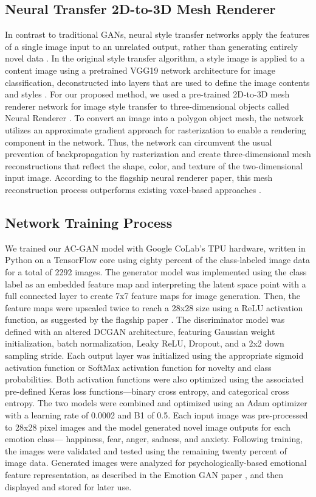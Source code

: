 \documentclass{sigchi}
\begin{document}
\subsection{Neural Transfer 2D-to-3D Mesh Renderer}
In contrast to traditional GANs, neural style transfer networks apply the features of a single image input to an unrelated output, rather than generating entirely novel data \cite{neuraltrans}. In the original style transfer algorithm, a style image is applied to a content image using a pretrained VGG19 network architecture for image classification, deconstructed into layers that are used to define the image contents and styles \cite{neuraltrans}. For our proposed method, we used a pre-trained 2D-to-3D mesh renderer network for image style transfer \cite{DBLP:journals/corr/abs-1711-07566}to three-dimensional objects called Neural Renderer \cite{DBLP:journals/corr/abs-1711-07566}. To convert an image into a polygon object mesh, the network utilizes an approximate gradient approach for rasterization to enable a rendering component in the network. Thus, the network can circumvent the usual prevention of backpropagation by rasterization and create three-dimensional mesh reconstructions that reflect the shape, color, and texture of the two-dimensional input image. According to the flagship neural renderer paper, this mesh reconstruction process outperforms existing voxel-based approaches \cite{DBLP:journals/corr/abs-1711-07566}.

\subsection{Network Training Process}
We trained our AC-GAN model with Google CoLab’s TPU hardware, written in Python on a TensorFlow core using eighty percent of the class-labeled image data for a total of 2292 images. The generator model was implemented using the class label as an embedded feature map and interpreting the latent space point with a full connected layer to create 7x7 feature maps for image generation. Then, the feature maps were upscaled twice to reach a 28x28 size using a ReLU activation function, as suggested by the flagship paper \cite{10.5555/3305890.3305954}. The discriminator model was defined with an altered DCGAN architecture, featuring Gaussian weight initialization, batch normalization, Leaky ReLU, Dropout, and a 2x2 down sampling stride. Each output layer was initialized using the appropriate sigmoid activation function or SoftMax activation function for novelty and class probabilities. Both activation functions were also optimized using the associated pre-defined Keras loss functions—binary cross entropy, and categorical cross entropy. The two models were combined and optimized using an Adam optimizer with a learning rate of 0.0002 and B1 of 0.5. Each input image was pre-processed to 28x28 pixel images and the model generated novel image outputs for each emotion class— happiness, fear, anger, sadness, and anxiety. Following training, the images were validated and tested using the remaining twenty percent of image data. Generated images were analyzed for psychologically-based emotional feature representation, as described in the Emotion GAN paper \cite{AlvarezMelis2017TheEG}, and then displayed and stored for later use. 
\end{document}
